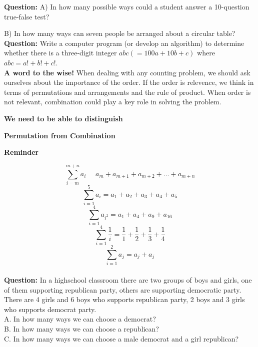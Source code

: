 \documentclass[11pt]{article}
\begin{document}
\textbf{Question:} A) In how many possible ways could a student answer a 10-question true-false test? %

B) In how many ways can seven people be arranged about a circular table?
\\

\textbf{Question:}  Write a computer program (or develop an algorithm) to determine whether there is a three-digit integer $abc (= 100a + 10b + c)$ where $abc = a! + b! + c!$.
\\ %

\textbf{A word to the wise!} When dealing with any counting problem, we should ask ourselves about the importance of the order. If the order is relevence, we think in terms of permutations and arrangements and the rule of product. When order is not relevant, combination could play a key role in solving the problem.
\\

\begin{center}
\textbf{We need to be able to distinguish}

\textbf{Permutation from Combination}
\end{center}


\begin{center}
\textbf{Reminder}
\end{center}

$$\sum\limits_{i = m}^{m+n}{a_i = a_m+a_{m+1}+a_{m+2}+...+a_{m+n}}$$
$$\sum\limits_{i = 1}^5{a_i = a_1+a_2+a_3+a_4+a_5}$$
$$\sum\limits_{i = 1}^4{a_{i^2} = a_1+a_4+a_9+a_{16}}$$
$$\sum\limits_{i = 1}^4{\frac{1}{i} =\frac{1}{1}+\frac{1}{2}+\frac{1}{3}+\frac{1}{4}}$$
$$\sum\limits_{i = 1}^2{a_j = a_j+a_j}$$
\\

\textbf{Question:} In a highschool classroom there are two groups of boys and girls, one of them supporting republican party, others are supporting democratic party. There are 4 girls and 6 boys who supports republican party, 2 boys and 3 girls who supports democrat party.\\ %
A. In how many ways we can choose a democrat?\\
B. In how many ways we can choose a republican?\\
C. In how many ways we can choose a male democrat and a girl republican?\\
\\
\end{document}
